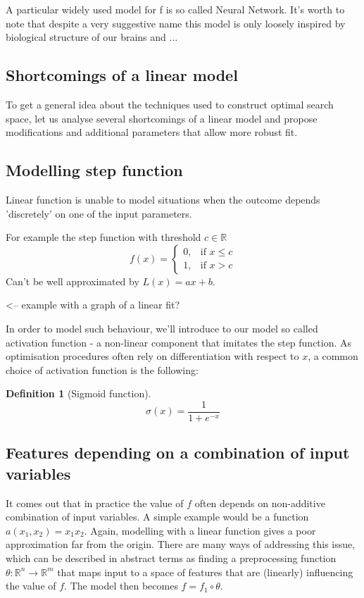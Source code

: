 \documentclass[a4paper]{article}
\theoremstyle{break}
\newtheorem{definition}{Definition}[section]
\newcommand{\R}{\mathbb{R}}
\begin{document}
A particular widely used model for f is so called Neural Network. It's worth to note that despite a very suggestive name this model is only loosely inspired by biological structure of our brains and ...

\subsection{Shortcomings of a linear model}
To get a general idea about the techniques used to construct optimal search space, let us analyse several shortcomings of a linear model and propose modifications and additional parameters that allow more robust fit.

\subsection{Modelling step function}
Linear function is unable to model situations when the outcome depends 'discretely' on one of the input parameters.

For example the step function with threshold $c \in \R$
$$ f(x) =
\begin{cases}
    0,& \text{if } x\leq c\\
    1,& \text{if } x > c
\end{cases}$$
Can't be well approximated by $L(x) = a x  + b$.

<-- example with a graph of a linear fit?

In order to model such behaviour, we'll introduce to our model so called activation function - a non-linear component  that imitates the step function. As optimisation procedures often rely on differentiation with respect to $x$, a common choice of activation function is the following:

\begin{definition}[Sigmoid function]
    $$ \sigma(x) = \frac{1}{1 + e^{-x}}$$
\end{definition}

 
\subsection{Features depending on a combination of input variables}
It comes out that in practice the value of $f$ often depends on non-additive combination of input variables. A simple example would be a function $a(x_1, x_2) = x_1 x_2$. Again, modelling with a linear function gives a poor approximation far from the origin.
There are many ways of addressing this issue, which can be described in abstract terms as finding a preprocessing function $ \theta : \R^n \to \R^m$ that maps input to a space of features that are (linearly) influencing the value of $f$. The model then becomes $ f = f_1 \circ \theta $.
\end{document}
